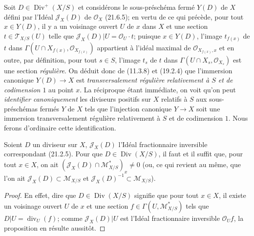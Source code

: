 \begin{env}[21.15.3.3]
\label{IV.21.15.3.3}
Soit $D\in\operatorname{Div}^+(X/S)$ et considérons le sous-préschéma fermé $Y(D)$
de $X$ défini par l'Idéal $\mathscr J_X(D)$ de $\mathcal O_X$ (21.6.5); en vertu de
ce qui précède, pour tout $x\in Y(D)$, il y a un voisinage ouvert $U$ de $x$ dans $X$
et une section $t\in\mathscr T_{X/S}(U)$ telle que
$\mathscr J_X(D)|U=\mathcal O_U\cdot t$; puisque $x\in Y(D)$, l'image $t_{f(x)}$ de
$t$ dans $\Gamma(U\cap X_{f(x)},\mathcal O_{X_{f(x)}})$ appartient à l'idéal maximal
de $\mathcal O_{X_{f(x)},x}$ et en outre, par définition, pour tout $s\in S$, l'image
$t_s$ de $t$ dans $\Gamma(U\cap X_s,\mathcal O_{X_s})$ est une section
\emph{régulière}. On déduit donc de (11.3.8) et (19.2.4) que l'immersion canonique
$Y(D)\to X$ est \emph{transversalement régulière relativement à $S$ et de
codimension $1$} au point $x$. La réciproque étant immédiate, on voit qu'on peut
\emph{identifier canoniquement} les diviseurs positifs sur $X$ relatifs à $S$ aux
sous-préschémas fermés $Y$ de $X$ tels que l'injection canonique $Y\to X$ soit une
immersion transversalement régulière relativement à $S$ et de codimension $1$. Nous
ferons d'ordinaire cette identification.
\end{env}

\begin{proposition}[21.15.4]
\label{IV.21.15.4}
Soient $D$ un diviseur sur $X$, $\mathscr J_X(D)$ l'Idéal fractionnaire inversible
correspondant (21.2.5). Pour que $D\in\operatorname{Div}(X/S)$, il faut et il suffit
que, pour tout $x\in X$, on ait
$(\mathscr J_X(D)\cap\mathscr M_{X/S}^*)_x\ne0$ (ou, ce qui revient au même, que
l'on ait $\mathscr J_X(D)\subset\mathscr M_{X/S}$ et
$\mathscr J_X(D)^{-1}\subset\mathscr M_{X/S}$).
\end{proposition}

\begin{proof}
En effet, dire que $D\in\operatorname{Div}(X/S)$ signifie que pour tout $x\in X$, il
existe un voisinage ouvert $U$ de $x$ et une section
$f\in\Gamma(U,\mathscr M_{X/S}^*)$ tels que $D|U=\operatorname{div}_U(f)$; comme
$\mathscr J_X(D)|U$ est l'Idéal fractionnaire inversible $\mathcal O_Uf$, la
proposition en résulte aussitôt.
\end{proof}

